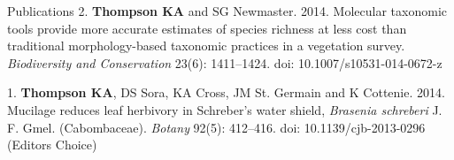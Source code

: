 \documentclass[11pt]{article}
\begin{document}
\begin{rSection}{Publications}
\noindent\hspace{.1cm}2. \textbf{Thompson KA} and SG Newmaster. 2014. Molecular taxonomic tools provide more accurate estimates of species richness at less cost than traditional morphology-based taxonomic practices in a vegetation survey. \textit{Biodiversity and Conservation} 23(6): 1411–1424. doi: 10.1007/s10531-014-0672-z

\noindent\hspace{.1cm}1. \textbf{Thompson KA}, DS Sora, KA Cross, JM St. Germain and K Cottenie. 2014. Mucilage reduces leaf herbivory in Schreber’s water shield, \textit{Brasenia schreberi} J. F. Gmel. (Cabombaceae). \textit{Botany} 92(5): 412–416. doi: 10.1139/cjb-2013-0296\\
(Editor\textquotesingle s Choice)

\vspace{0.5em} %


\end{rSection}
\end{document}
